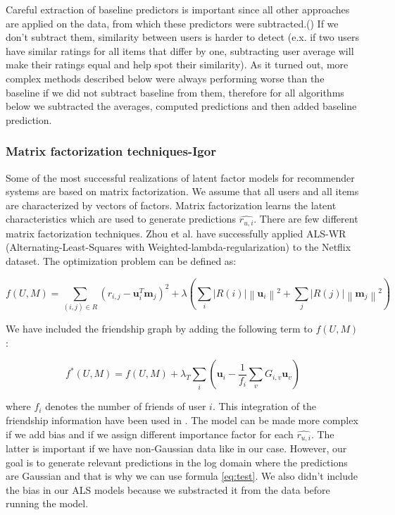 \documentclass{article} %
\begin{document}
Careful extraction of baseline predictors
is important since all other approaches are applied on the data, from which
these predictors were subtracted.(\citep{bell2007lessons}) If we don't subtract
them, similarity between users is harder to detect (e.x. if two users have similar ratings for all items
that differ by one, subtracting user average will make their ratings equal and
help spot their similarity). As it turned out, more complex methods described
below were always performing worse than the baseline if we did not subtract
baseline from them, therefore for all algorithms below we subtracted the
averages, computed predictions and then added baseline prediction.

\subsubsection{Matrix factorization techniques-Igor}

Some of the most successful realizations of latent factor models for recommender 
systems are based on matrix factorization\citep{bell2007lessons}. We assume
that all users and all items are characterized by vectors of factors. Matrix factorization learns the 
latent characteristics which are used to generate predictions $\hat{r_{u,i}}$. 
There are few different matrix factorization techniques. Zhou et al. \cite{zhou2008large} have
successfully applied ALS-WR (Alternating-Least-Squares with Weighted-lambda-regularization) to the Netflix dataset. 
The optimization problem can be defined as:

\begin{equation}\label{eq:one}
f(U, M)=\sum_{\left ( i,j \right )\in R} \left ( r_{i,j} -
\mathbf{u}^{T}_{i}\mathbf{m}_{j} \right )^{2}+\lambda \left ( \sum_{i}|R(i)|
\left \| \mathbf{u}_{i} \right \| ^{2} + \sum_{j}|R(j)|\left \| \mathbf{m}_{j}
\right \| ^{2} \right )
\end{equation}


We have included the friendship graph by adding the following term to $f(U, M)$:

\begin{equation}\label{eq:test}
f^{*}(U, M)=f(U, M)+\lambda
_{T}\sum_{i}(\mathbf{u}_{i}-\frac{1}{f_{i}}\sum_{v}G_{i,v}\mathbf{u}_{v})
\end{equation}

where $f_{i}$ denotes the number of friends of user $i$. 
This integration of the friendship information have been used in \cite{jamali2010matrix}. The
model can be made more complex if we add bias and if we assign different importance 
factor for each $\hat{r_{u,i}}$. The latter is important if we have non-Gaussian data like in our case. 
However, our goal is to generate relevant predictions in the log domain where the predictions are Gaussian 
and that is why we can use formula \eqref{eq:test}. 
We also didn't include the bias in our ALS models because 
we substracted it from the data before running the model.
\end{document}
